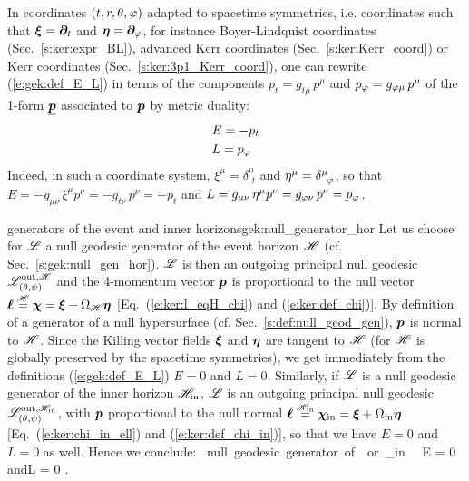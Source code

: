 In coordinates $(t,r,\theta,\varphi)$ adapted to spacetime symmetries,
i.e. coordinates such that $\bm{\xi} = \bm{\partial}_t$ and $\bm{\eta}=\bm{\partial}_\varphi$,
for instance Boyer-Lindquist coordinates (Sec.~\ref{s:ker:expr_BL}),
advanced Kerr coordinates (Sec.~\ref{s:ker:Kerr_coord}) or Kerr coordinates
(Sec.~\ref{s:ker:3p1_Kerr_coord}), one can rewrite
(\ref{e:gek:def_E_L})
in terms of the components $p_t = g_{t\mu} \, p^\mu$ and $p_\varphi = g_{\varphi\mu} \, p^\mu$
of the 1-form $\underline{\bm{p}}$ associated to $\bm{p}$ by metric duality:
\begin{subequations}
\label{e:gek:E_pt_L_pph}
\begin{align}
& E = - p_t \\
& L = p_\varphi
\end{align}
\end{subequations}
Indeed, in such a coordinate system, $\xi^\mu =  \delta^\mu_{\ \, t}$
and $\eta^\mu = \delta^\mu_{\ \, \varphi}$, so that $E = -g_{\mu\nu} \, \xi^\mu p^\nu = -g_{t\nu} \, p^\nu = -p_t$
and $L = g_{\mu\nu} \, \eta^\mu p^\nu = g_{\varphi\nu} \, p^\nu = p_\varphi$.

\begin{texample}{generators of the event and inner horizons}{gek:null_generator_hor}
Let us choose for $\mathscr{L}$ a null geodesic generator of the event horizon $\mathscr{H}$
(cf. Sec.~\ref{s:gek:null_gen_hor}). $\mathscr{L}$ is then an outgoing principal null
geodesic $\mathscr{L}^{{\rm out},\mathscr{H}}_{(\theta,\psi)}$
and the 4-momentum vector $\bm{p}$ is proportional to the null vector
$\bm{\ell} \stackrel{\mathscr{H}}{=} \bm{\chi} = \bm{\xi} + \Omega_{\mathscr{H}} \bm{\eta}$ [Eq.~(\ref{e:ker:l_eqH_chi})
and (\ref{e:ker:def_chi})].
By definition of a
generator of a null hypersurface (cf. Sec.~\ref{s:def:null_geod_gen}),
$\bm{p}$ is normal to $\mathscr{H}$. Since the Killing vector fields $\bm{\xi}$ and $\bm{\eta}$
are tangent to $\mathscr{H}$ (for $\mathscr{H}$ is globally preserved by the
spacetime symmetries), we get immediately from
the definitions (\ref{e:gek:def_E_L}) $E=0$ and $L=0$.
Similarly, if $\mathscr{L}$ is a null geodesic generator of the
inner horizon $\mathscr{H}_{\rm in}$, $\mathscr{L}$ is an outgoing principal null
geodesic $\mathscr{L}^{{\rm out},\mathscr{H}_{\rm in}}_{(\theta,\psi)}$, with $\bm{p}$ proportional to
the null normal
$\bm{\ell} \stackrel{\mathscr{H}_{\rm in}}{=} \bm{\chi}_{\rm in} = \bm{\xi} + \Omega_{\rm in} \bm{\eta}$
[Eq.~(\ref{e:ker:chi_in_ell}) and (\ref{e:ker:def_chi_in})], so that we
have $E=0$ and $L=0$ as well. Hence we conclude:
\be \label{e:gek:generator_hor_E_L_zero}
    \Li \ \mbox{null geodesic generator of}\ \Hor\ \mbox{or}\ \Hor_{\rm in}
   \  \Longrightarrow\  E = 0 \quad\mbox{and}\quad L = 0 .
\ee
\end{texample}

